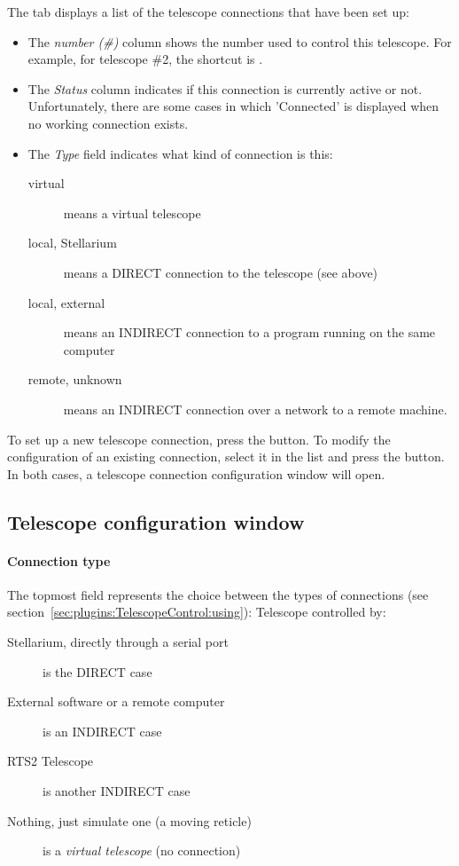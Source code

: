\noindent The  tab displays a list of the telescope connections that have been set up:

\begin{itemize}
\item The \emph{number (\#)} column shows the number used to control this
  telescope. For example, for telescope \#2, the shortcut is
  .
\item The \emph{Status} column indicates if this connection is
  currently active or not. Unfortunately, there are some cases in
  which 'Connected' is displayed when no working connection exists.
\item The \emph{Type} field indicates what kind of connection is this:
  \begin{description}
  \item[virtual] means a virtual telescope
  \item[local, Stellarium] means a
    DIRECT connection to the telescope (see above)
  \item[local, external] means an INDIRECT connection to a program
    running on the same computer
  \item[remote, unknown] means an INDIRECT connection over a network
    to a remote machine.
  \end{description}
\end{itemize}

\noindent To set up a new telescope connection, press the  button. To modify
the configuration of an existing connection, select it in the list and
press the  button. In both cases, a telescope connection
configuration window will open.



\subsection{Telescope configuration window}

\paragraph{Connection type}
The topmost field represents the choice between the types of connections (see section~\ref{sec:plugins:TelescopeControl:using}):
Telescope controlled by:
\begin{description}
\item[Stellarium, directly through a serial port] is the DIRECT case
\item[External software or a remote computer] is an INDIRECT case
\item[RTS2 Telescope] is another INDIRECT case
\item[Nothing, just simulate one (a moving reticle)] is a \emph{virtual telescope} (no connection)
\end{description}

